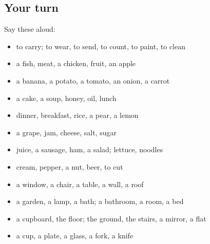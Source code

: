 \subsection*{Your turn}
Say these aloud:

\begin{itemize}
\raggedright
  \item to carry; to wear, to send, to count, to paint, to clean
  \item a fish, meat, a chicken, fruit, an apple
  \item a banana, a potato, a tomato, an onion, a carrot
  \item a cake, a soup, honey, oil, lunch
  \item dinner, breakfast, rice, a pear, a lemon
  \item a grape, jam, cheese, salt, sugar
  \item juice, a sausage, ham, a salad; lettuce, noodles
  \item cream, pepper, a nut, beer, to cut
  \item a window, a chair, a table, a wall, a roof
  \item a garden, a lamp, a bath; a bathroom, a room, a bed
  \item a cupboard, the floor; the ground, the stairs, a mirror, a flat
  \item a cup, a plate, a glass, a fork, a knife
\end{itemize}

